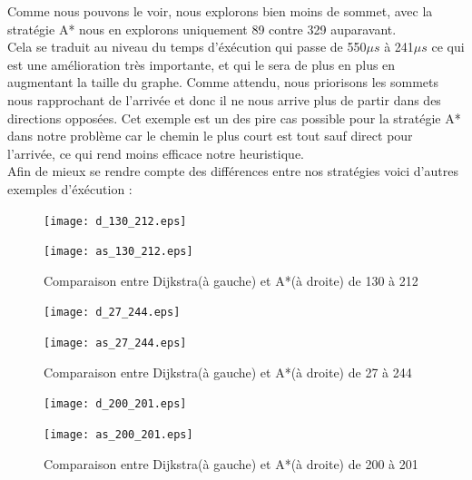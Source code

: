\documentclass{article}
\begin{document}
Comme nous pouvons le voir, nous explorons bien moins de sommet, avec la stratégie A* nous en
explorons uniquement 89 contre 329 auparavant.\\
Cela se traduit au niveau du temps d'éxécution qui passe de 550$\mu s$ à 241$\mu s$ ce qui est
une amélioration très importante, et qui le sera de plus en plus en augmentant la taille du
graphe.
Comme attendu, nous priorisons les sommets nous rapprochant de l'arrivée et donc il ne nous arrive
plus de partir dans des directions opposées. Cet exemple est un des pire cas possible pour 
la stratégie A* dans notre problème car le chemin le plus court est tout sauf direct pour
l'arrivée, ce qui rend moins efficace notre heuristique.\\

Afin de mieux se rendre compte des différences entre nos stratégies voici d'autres exemples
d'éxécution :\\


\begin{figure}[!hbt]
		\begin{minipage}{0.45\textwidth}
			\centering
			\texttt{[image: d\_130\_212.eps]}
		\end{minipage}
		\begin{minipage}{0.45\textwidth}
			\centering
			\texttt{[image: as\_130\_212.eps]}
		\end{minipage}
		\caption{Comparaison entre Dijkstra(à gauche) et A*(à droite) de 130 à 212}
		\label{vs_1}
\end{figure}


\begin{figure}[!hbt]
		\begin{minipage}{0.45\textwidth}
			\centering
			\texttt{[image: d\_27\_244.eps]}
		\end{minipage}
		\begin{minipage}{0.45\textwidth}
			\centering
			\texttt{[image: as\_27\_244.eps]}
		\end{minipage}
		\caption{Comparaison entre Dijkstra(à gauche) et A*(à droite) de 27 à 244}
		\label{vs_2}
\end{figure}

\clearpage

\begin{figure}[!hbt]
		\begin{minipage}{0.45\textwidth}
			\centering
			\texttt{[image: d\_200\_201.eps]}
		\end{minipage}
		\begin{minipage}{0.45\textwidth}
			\centering
			\texttt{[image: as\_200\_201.eps]}
		\end{minipage}
		\caption{Comparaison entre Dijkstra(à gauche) et A*(à droite) de 200 à 201}
		\label{vs_3}
\end{figure}
\end{document}
